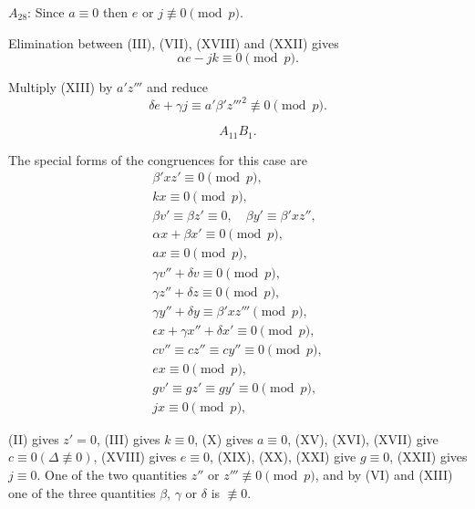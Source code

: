 \documentclass[oneside]{article}
\begin{document}
\smallskip
$A_{28}$: Since $a \equiv 0$ then $e$ or $j \not\equiv 0 \pmod{p}$.

Elimination between (III), (VII), (XVIII) and (XXII) gives
\begin{equation*}
\alpha e - jk \equiv 0 \pmod{p}.
\end{equation*}

Multiply (XIII) by $a'z'''$ and reduce
\begin{equation*}
\delta e + \gamma j \equiv a'\beta'{z'''}^2 \not\equiv 0 \pmod{p}.
\end{equation*}

\medskip
\begin{equation*} A_{11} B_1. \end{equation*}

The special forms of the congruences for this case are
\begin{gather*}
\beta'xz' \equiv 0 \pmod{p}, \tag{II} \\
kx \equiv 0 \pmod{p}, \tag{III} \\
\beta v' \equiv \beta z' \equiv 0, \quad \beta y' \equiv \beta'xz'',
  \tag*{(IV),(V),(VI)} \\
\alpha x + \beta x' \equiv 0 \pmod{p}, \tag{VII} \\
ax \equiv 0 \pmod{p}, \tag{X} \\
\gamma v'' + \delta v \equiv 0 \pmod{p}, \tag{XI} \\
\gamma z'' + \delta z \equiv 0 \pmod{p}, \tag{XII} \\
\gamma y'' + \delta y \equiv \beta'xz''' \pmod{p}, \tag{XIII} \\
\epsilon x + \gamma x'' + \delta x' \equiv 0 \pmod{p}, \tag{XIV} \\
cv'' \equiv cz'' \equiv cy'' \equiv 0 \pmod{p}, \tag*{(XV),(XVI),(XVII)} \\
ex \equiv 0 \pmod{p}, \tag{XVIII} \\
gv' \equiv gz' \equiv gy' \equiv 0 \pmod{p}, \tag*{(XIX),(XX),(XXI)} \\
jx \equiv 0 \pmod{p}, \tag{XXII}
\end{gather*}

(II) gives $z' = 0$, (III) gives $k \equiv 0$, (X) gives $a \equiv 0$,
(XV), (XVI), (XVII) give $c \equiv 0 (\Delta \not\equiv 0)$, (XVIII) gives
$e \equiv 0$, (XIX), (XX), (XXI) give $g \equiv 0$, (XXII) gives $j \equiv
0$. One of the two quantities $z''$ or $z''' \not\equiv 0 \pmod{p}$,
and by (VI) and (XIII) one of the three quantities $\beta$, $\gamma$ or
$\delta$ is $\not\equiv 0$.
\end{document}
